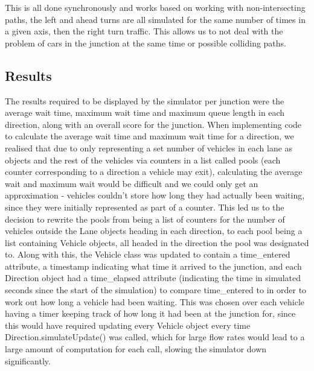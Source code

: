 \documentclass{article}
\begin{document}
    This is all done synchronously and works based on working with non-intersecting paths, the left and ahead turns are
    all simulated for the same number of times in a given axis, then the right turn traffic. This allows us to not deal
    with the problem of cars in the junction at the same time or possible colliding paths.

    \subsection{Results}\label{subsec:results_backend}
    The results required to be displayed by the simulator per junction were the average wait time, maximum wait time and
    maximum queue length in each direction, along with an overall score for the junction. When implementing code to
    calculate the average wait time and maximum wait time for a direction, we realised that due to only representing a
    set number of vehicles in each lane as objects and the rest of the vehicles via counters in a list called pools
    (each counter corresponding to a direction a vehicle may exit), calculating the average wait and maximum wait would
    be difficult and we could only get an approximation - vehicles couldn’t store how long they had actually been waiting,
    since they were initially represented as part of a counter. This led us to the decision to rewrite the pools from being
    a list of counters for the number of vehicles outside the Lane objects heading in each direction, to each pool being
    a list containing Vehicle objects, all headed in the direction the pool was designated to. Along with this, the Vehicle
    class was updated to contain a time\_entered attribute, a timestamp indicating what time it arrived to the junction,
    and each Direction object had a time\_elapsed attribute (indicating the time in simulated seconds since the start of
    the simulation) to compare time\_entered to in order to work out how long a vehicle had been waiting. This was chosen
    over each vehicle having a timer keeping track of how long it had been at the junction for, since this would have
    required updating every Vehicle object every time Direction.simulateUpdate() was called, which for large flow rates
    would lead to a large amount of computation for each call, slowing the simulator down significantly.
\end{document}
